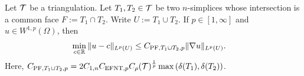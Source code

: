 \documentclass[10pt,a4paper]{article}
\begin{document}
\begin{lemma}\label{lemma:poincarefriedrichsoverfacepatch}
    Let ${\mathcal T}$ be a triangulation.
    Let $T_{1}, T_{2} \in {\mathcal T}$ be two $n$-simplices whose intersection is a common face $F := T_1 \cap T_2$. 
    Write $U := T_1 \cup T_2$. 
    If $p \in [1,\infty]$ and $u \in W^{1,p}(\Omega)$,
    then 
    \begin{align*}
        \min\limits_{ c \in {\mathbb R} }
        \| u - c \|_{L^{p}(U)}
        &
        \leq 
        C_{{{\rm PF}},T_1 \cup T_2,p}
        \| \nabla u \|_{L^{p}(U)}
        .
    \end{align*}
    Here, $C_{{{\rm PF}},T_1 \cup T_2,p} = 2 C_{1,n} C_{{\rm EFNT},p} C_\rho({\mathcal T})^{\frac 1 p} \max\left( {\delta}(T_1), {\delta}(T_2) \right)$. 
\end{lemma}
\end{document}
